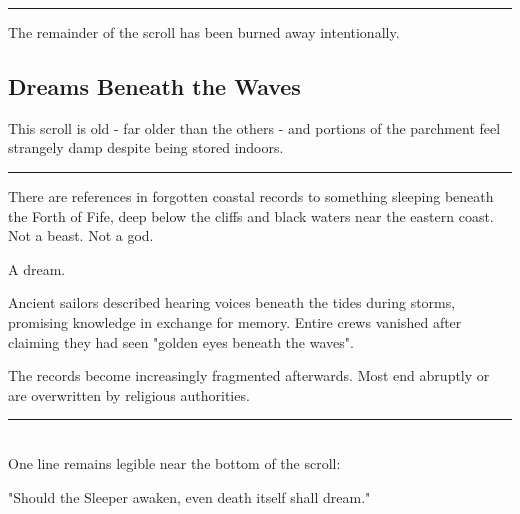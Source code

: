 \noindent\rule{\linewidth}{0.6pt}

The remainder of the scroll has been burned away intentionally.
\subsection*{Dreams Beneath the Waves}
This scroll is old - far older than the others - and portions of the parchment feel strangely damp despite being stored indoors.

\noindent\rule{\linewidth}{0.6pt}

{\entryfont There are references in forgotten coastal records to something sleeping beneath the Forth of Fife, deep below the cliffs and black waters near the eastern coast. Not a beast. Not a god.

A dream.

Ancient sailors described hearing voices beneath the tides during storms, promising knowledge in exchange for memory. Entire crews vanished after claiming they had seen "golden eyes beneath the waves".

The records become increasingly fragmented afterwards. Most end abruptly or are overwritten by religious authorities.}

\noindent\rule{\linewidth}{0.6pt}\\
One line remains legible near the bottom of the scroll:
\begin{center}
	\entryfont "Should the Sleeper awaken, even death itself shall dream."
\end{center}